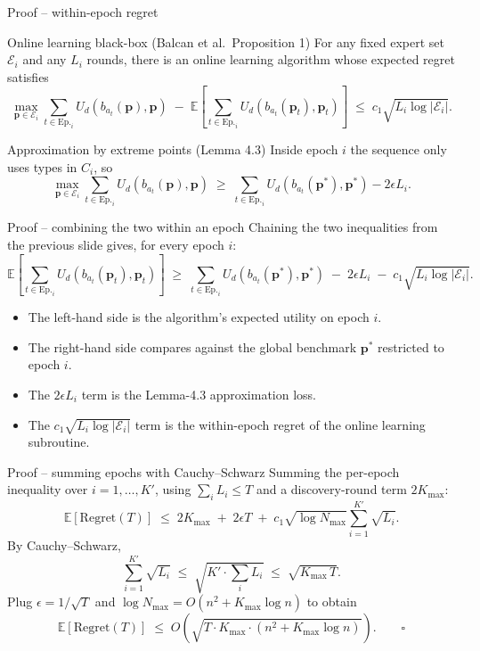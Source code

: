 \documentclass[10pt,aspectratio=169]{beamer}
\newcommand{\pvec}{\mathbf{p}}
\newcommand{\cE}{\mathcal{E}}
\newcommand{\Kmax}{K_{\max}}
\newcommand{\EE}{\mathbb{E}}
\begin{document}
\begin{frame}{Proof -- within-epoch regret}
\begin{block}{Online learning black-box (Balcan et al.\ Proposition 1)}
For any fixed expert set $\cE_i$ and any $L_i$ rounds, there is an online learning algorithm whose expected regret satisfies
\[
\max_{\pvec\in\cE_i}\sum_{t\in\text{Ep.}_i}\!U_d(b_{a_t}(\pvec),\pvec)\;-\;\EE\!\left[\sum_{t\in\text{Ep.}_i}\!U_d(b_{a_t}(\pvec_t),\pvec_t)\right]\;\le\;c_1\sqrt{L_i\log|\cE_i|}.
\]
\end{block}
\pause
\begin{block}{Approximation by extreme points (Lemma 4.3)}
Inside epoch $i$ the sequence only uses types in $C_i$, so
\[
\max_{\pvec\in\cE_i}\!\sum_{t\in\text{Ep.}_i}U_d(b_{a_t}(\pvec),\pvec)\;\ge\;\sum_{t\in\text{Ep.}_i}U_d(b_{a_t}(\pvec^{*}),\pvec^{*})-2\epsilon L_i.
\]
\end{block}
\end{frame}


\begin{frame}{Proof -- combining the two within an epoch}
Chaining the two inequalities from the previous slide gives, for every epoch $i$:
\[
\EE\!\left[\sum_{t\in\text{Ep.}_i}\!U_d(b_{a_t}(\pvec_t),\pvec_t)\right]\;\ge\;\sum_{t\in\text{Ep.}_i}U_d(b_{a_t}(\pvec^{*}),\pvec^{*})\;-\;2\epsilon L_i\;-\;c_1\sqrt{L_i\log|\cE_i|}.
\]
\vspace{4pt}
\begin{itemize}\small
\item The left-hand side is the algorithm's expected utility on epoch $i$.
\item The right-hand side compares against the global benchmark $\pvec^{*}$ restricted to epoch $i$.
\item The $2\epsilon L_i$ term is the Lemma-4.3 approximation loss.
\item The $c_1\sqrt{L_i\log|\cE_i|}$ term is the within-epoch regret of the online learning subroutine.
\end{itemize}
\end{frame}


\begin{frame}{Proof -- summing epochs with Cauchy--Schwarz}
Summing the per-epoch inequality over $i=1,\dots,K'$, using $\sum_i L_i\le T$ and a discovery-round term $2\Kmax$:
\[
\EE[\mathrm{Regret}(T)]\;\le\;2\Kmax\;+\;2\epsilon T\;+\;c_1\sqrt{\log N_{\max}}\sum_{i=1}^{K'}\sqrt{L_i}.
\]
\pause
By Cauchy--Schwarz,
\[
\sum_{i=1}^{K'}\sqrt{L_i}\;\le\;\sqrt{K'\cdot\textstyle\sum_i L_i}\;\le\;\sqrt{\Kmax\,T}.
\]
\pause
Plug $\epsilon=1/\sqrt T$ and $\log N_{\max}=O(n^2+\Kmax\log n)$ to obtain
\[
\EE[\mathrm{Regret}(T)]\;\le\;O\!\left(\sqrt{T\cdot\Kmax\cdot(n^2+\Kmax\log n)}\right).\qquad\square
\]
\end{frame}
\end{document}
